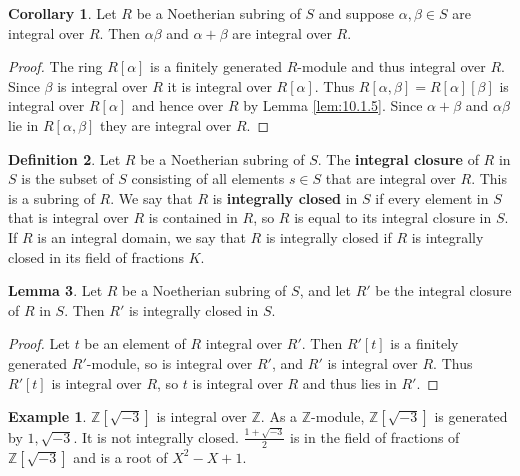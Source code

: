 \documentclass{article}
\newcommand{\Z}{\mathbb{Z}}
\renewcommand{\sb}[1]{\left[ #1 \right]}
\theoremstyle{definition}\newtheorem{definition}{Definition}[subsection]
\theoremstyle{definition}\newtheorem{remark}[definition]{Remark}
\theoremstyle{definition}\newtheorem*{example}{Example}
\theoremstyle{definition}\newtheorem*{note}{Note}
\newtheorem{lemma}[definition]{Lemma}
\newtheorem{corollary}[definition]{Corollary}
\begin{document}
\begin{corollary}
Let $ R $ be a Noetherian subring of $ S $ and suppose $ \alpha, \beta \in S $ are integral over $ R $. Then $ \alpha\beta $ and $ \alpha + \beta $ are integral over $ R $.
\end{corollary}

\begin{proof}
The ring $ R\sb{\alpha} $ is a finitely generated $ R $-module and thus integral over $ R $. Since $ \beta $ is integral over $ R $ it is integral over $ R\sb{\alpha} $. Thus $ R\sb{\alpha, \beta} = R\sb{\alpha}\sb{\beta} $ is integral over $ R\sb{\alpha} $ and hence over $ R $ by Lemma \ref{lem:10.1.5}. Since $ \alpha + \beta $ and $ \alpha\beta $ lie in $ R\sb{\alpha, \beta} $ they are integral over $ R $.
\end{proof}


\begin{definition}
Let $ R $ be a Noetherian subring of $ S $. The \textbf{integral closure} of $ R $ in $ S $ is the subset of $ S $ consisting of all elements $ s \in S $ that are integral over $ R $. This is a subring of $ R $. We say that $ R $ is \textbf{integrally closed} in $ S $ if every element in $ S $ that is integral over $ R $ is contained in $ R $, so $ R $ is equal to its integral closure in $ S $. If $ R $ is an integral domain, we say that $ R $ is integrally closed if $ R $ is integrally closed in its field of fractions $ K $.
\end{definition}

\begin{lemma}
Let $ R $ be a Noetherian subring of $ S $, and let $ R' $ be the integral closure of $ R $ in $ S $. Then $ R' $ is integrally closed in $ S $.
\end{lemma}

\begin{proof}
Let $ t $ be an element of $ R $ integral over $ R' $. Then $ R'\sb{t} $ is a finitely generated $ R' $-module, so is integral over $ R' $, and $ R' $ is integral over $ R $. Thus $ R'\sb{t} $ is integral over $ R $, so $ t $ is integral over $ R $ and thus lies in $ R' $.
\end{proof}

\begin{example}
$ \Z\sb{\sqrt{-3}} $ is integral over $ \Z $. As a $ \Z $-module, $ \Z\sb{\sqrt{-3}} $ is generated by $ 1, \sqrt{-3} $. It is not integrally closed. $ \tfrac{1 + \sqrt{-3}}{2} $ is in the field of fractions of $ \Z\sb{\sqrt{-3}} $ and is a root of $ X^2 - X + 1 $.
\end{example}
\end{document}
